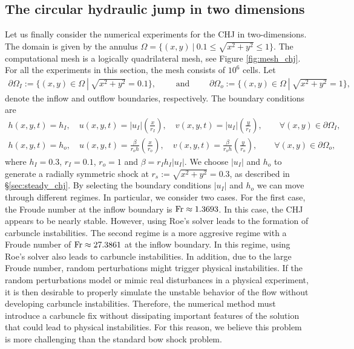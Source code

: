 \documentclass[preprint, 11pt]{article}
\newcommand{\bfu}{{u}}
\newcommand{\Fr}{{\rm Fr}}
\begin{document}
\subsection{The circular hydraulic jump in two dimensions}\label{sec:2D_chj}
Let us finally consider the numerical experiments for the CHJ in two-dimensions.
The domain is given by the annulus $\Omega=\{(x,y)~|~ 0.1\leq\sqrt{x^2+y^2}\leq 1\}$.
The computational mesh is a logically quadrilateral mesh, see Figure \ref{fig:mesh_chj}.
For all the experiments in this section, the mesh consists of $10^6$ cells. 
Let
\begin{align*}
  \partial\Omega_I:=\{(x,y)\in\Omega ~|~ \sqrt{x^2+y^2}=0.1\}, \qquad \mbox{ and } \qquad
  \partial\Omega_o:=\{(x,y)\in\Omega ~|~ \sqrt{x^2+y^2}=1\},
\end{align*}
denote the inflow and outflow boundaries, respectively. 
The boundary conditions are 
\begin{subequations}\label{bcs_chj}
  \begin{align}
  h(x,y,t)=h_I, \quad
  u(x,y,t)=|\bfu_I| \left(\frac{x}{r_I}\right), \quad
  v(x,y,t)=|\bfu_I| \left(\frac{y}{r_I}\right), \qquad \forall (x,y)\in\partial\Omega_I, \\
  h(x,y,t)=h_o, \quad 
  u(x,y,t)= \frac{\beta }{r_o h}\left(\frac{x}{r_o}\right), \quad
  v(x,y,t)= \frac{\beta }{r_o h}\left(\frac{y}{r_o}\right), \qquad \forall (x,y)\in\partial\Omega_o, \label{bcs_chj_outflow}
  \end{align}
\end{subequations}
where $h_I=0.3$, $r_I=0.1$, $r_o=1$ and $\beta=r_Ih_I|\bfu_I|$.
We choose $|\bfu_I|$ and $h_o$ to generate a radially symmetric shock at $r_s:=\sqrt{x^2+y^2}=0.3$, as described in \S \ref{sec:steady_chj}.
By selecting the boundary conditions $|\bfu_I|$ and $h_o$ we can move through different regimes.
In particular, we consider two cases.
For the first case, the Froude number at the inflow boundary is $\Fr\approx 1.3693$.
In this case, the CHJ appears to be nearly stable.
However, using Roe's solver leads to the formation of carbuncle instabilities.
%
The second regime is a more aggresive regime with a Froude number of $\Fr\approx 27.3861$ at the inflow boundary. 
In this regime, using Roe's solver also leads to carbuncle instabilities. In addition, 
due to the large Froude number, random perturbations might trigger physical instabilities. 
If the random perturbations model or mimic real disturbances in a physical experiment, it is then
desirable to properly simulate the unstable behavior of the flow without developing carbuncle instabilities. 
Therefore, the numerical method must introduce a carbuncle fix without dissipating important features of the
solution that could lead to physical instabilities. 
For this reason, we believe this problem is more challenging than the standard bow shock problem.
\end{document}
